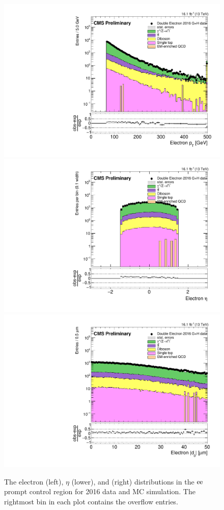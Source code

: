 \begin{figure}[hbtp]
\centering
\includegraphics[scale=0.3]{figures/selection/pcr_ee_2016/electronPt.pdf}
\includegraphics[scale=0.3]{figures/selection/pcr_ee_2016/electronEta.pdf}
\includegraphics[scale=0.3]{figures/selection/pcr_ee_2016/electronAbsD0_50um.pdf}
\caption{The electron \pt (left), $\eta$ (lower), and \ad (right) distributions in the $\mathrm{e}\mathrm{e}$ prompt control region for 2016 data and MC simulation. The rightmost bin in each plot
contains the overflow entries.}
\label{pcr_ee_2016}
\end{figure}